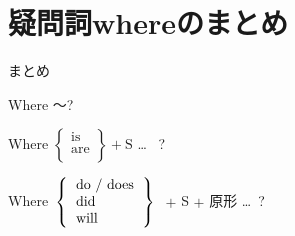 \documentclass[aspectratio=169,xcolor={dvipsnames,table}]{beamer}
\begin{document}
\section{疑問詞whereのまとめ}
\begin{frame}[plain]{まとめ}
 \begin{block}{Where ～?}
\begin{description}[　　　　]
 \item[be動詞] %
Where $\left\{
\begin{array}{l}
 \text{is}\\
 \text{are}\\
\end{array}
\right\} + \text{S}$ \ldots\,\,\, ?
 \item[一般動詞] Where\,\,\,$\left\{ \begin{tabular}{l}
	  do / does\\
	  did\\
	  will\\
	 \end{tabular}\right\}$%
\,\,$+$ S $+$ 原形 \ldots\,\,\,?
\end{description}
  
 \end{block}
\end{frame}
\end{document}
